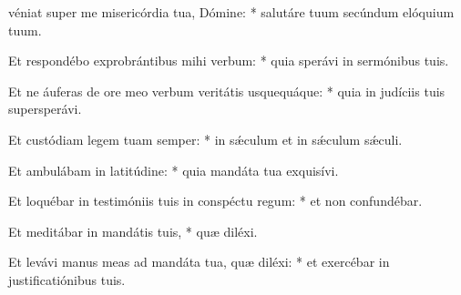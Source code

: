 \begin{psalmus}

 véniat super me misericórdia tua, Dómine: * salutáre tuum secúndum elóquium tuum.

Et respondébo exprobrántibus mihi verbum: * quia sperávi in sermónibus tuis.

Et ne áuferas de ore meo verbum veritátis usquequáque: * quia in judíciis tuis supersperávi.

Et custódiam legem tuam semper: * in sǽculum et in sǽculum sǽculi.

Et ambulábam in latitúdine: * quia mandáta tua exquisívi.

Et loquébar in testimóniis tuis in conspéctu regum: * et non confundébar.

Et meditábar in mandátis tuis, * quæ diléxi.

Et levávi manus meas ad mandáta tua, quæ diléxi: * et exercébar in justificatiónibus tuis.

\end{psalmus}
